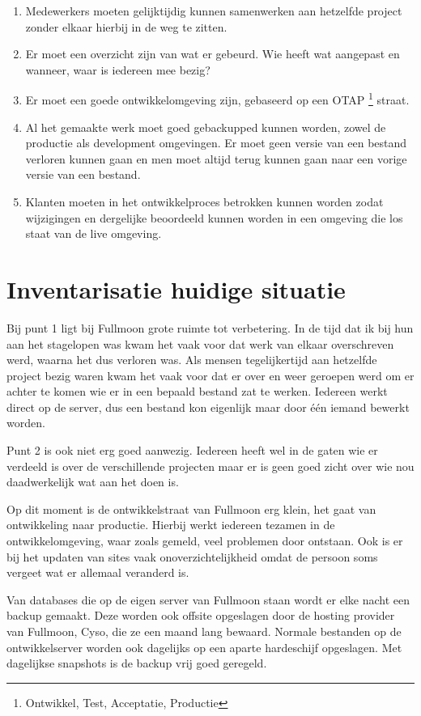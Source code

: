 \documentclass[12pt,a4paper]{article}
\begin{document}
  \begin{enumerate}
    \item Medewerkers moeten gelijktijdig kunnen samenwerken aan hetzelfde project zonder elkaar hierbij in de weg te zitten.
    \item Er moet een overzicht zijn van wat er gebeurd. Wie heeft wat aangepast en wanneer, waar is iedereen mee bezig?
    \item Er moet een goede ontwikkelomgeving zijn, gebaseerd op een OTAP \footnote{Ontwikkel, Test, Acceptatie, Productie} straat.
    \item Al het gemaakte werk moet goed gebackupped kunnen worden, zowel de productie als development omgevingen. Er moet geen versie van een bestand verloren kunnen gaan en men moet altijd terug kunnen gaan naar een vorige versie van een bestand.
    \item Klanten moeten in het ontwikkelproces betrokken kunnen worden zodat wijzigingen en dergelijke beoordeeld kunnen worden in een omgeving die los staat van de live omgeving.
  \end{enumerate}

  \section{Inventarisatie huidige situatie}
  
  Bij punt 1 ligt bij Fullmoon grote ruimte tot verbetering. In de tijd dat ik bij hun aan het stagelopen was kwam het vaak voor dat werk van elkaar overschreven werd, waarna het dus verloren was. Als mensen tegelijkertijd aan hetzelfde project bezig waren kwam het vaak voor dat er over en weer geroepen werd om er achter te komen wie er in een bepaald bestand zat te werken. Iedereen werkt direct op de server, dus een bestand kon eigenlijk maar door \'{e}\'{e}n iemand bewerkt worden.
  
  Punt 2 is ook niet erg goed aanwezig. Iedereen heeft wel in de gaten wie er verdeeld is over de verschillende projecten maar er is geen goed zicht over wie nou daadwerkelijk wat aan het doen is.
  
  Op dit moment is de ontwikkelstraat van Fullmoon erg klein, het gaat van ontwikkeling naar productie. Hierbij werkt iedereen tezamen in de ontwikkelomgeving, waar zoals gemeld, veel problemen door ontstaan. Ook is er bij het updaten van sites vaak onoverzichtelijkheid omdat de persoon soms vergeet wat er allemaal veranderd is.
  
  Van databases die op de eigen server van Fullmoon staan wordt er elke nacht een backup gemaakt. Deze worden ook offsite opgeslagen door de hosting provider van Fullmoon, Cyso, die ze een maand lang bewaard. Normale bestanden op de ontwikkelserver worden ook dagelijks op een aparte hardeschijf opgeslagen. Met dagelijkse snapshots is de backup vrij goed geregeld.
  
\end{document}
